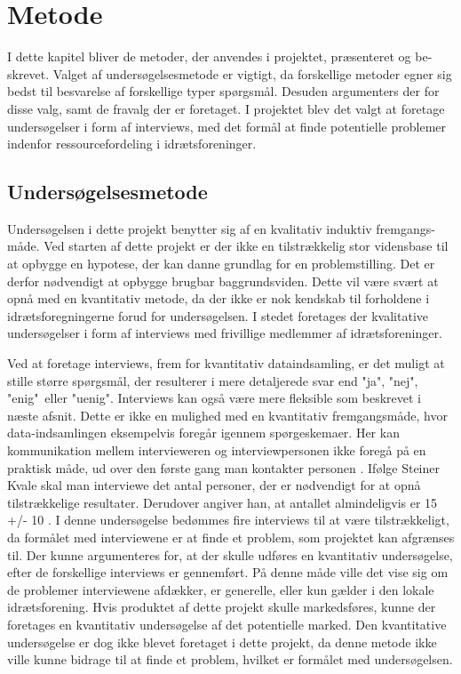 \chapter{Metode}\label{ch:metode}
I dette kapitel bliver de metoder, der anvendes i projektet, præsenteret og be-skrevet. Valget af undersøgelsesmetode er vigtigt, da forskellige metoder egner sig bedst til besvarelse af forskellige typer spørgsmål. Desuden argumenters der for disse valg, samt de fravalg der er foretaget. I projektet blev det valgt at foretage undersøgelser i form af interviews, med det formål at finde potentielle problemer indenfor ressourcefordeling i idrætsforeninger.

\section{Undersøgelsesmetode}
Undersøgelsen i dette projekt benytter sig af en kvalitativ induktiv fremgangs-måde. Ved starten af dette projekt er der ikke en tilstrækkelig stor vidensbase til at opbygge en hypotese, der kan danne grundlag for en problemstilling. Det er derfor nødvendigt at opbygge brugbar baggrundsviden. Dette vil være svært at opnå med en kvantitativ metode, da der ikke er nok kendskab til forholdene i idrætsforegningerne forud for undersøgelsen. I stedet foretages der kvalitative undersøgelser i form af interviews med frivillige medlemmer af idrætsforeninger.
\par
Ved at foretage interviews, frem for kvantitativ dataindsamling, er det muligt at stille større spørgsmål, der resulterer i mere detaljerede svar end "ja", "nej", "enig"\ eller "uenig". Interviews kan også være mere fleksible som beskrevet i næste afsnit. Dette er ikke en mulighed med en kvantitativ fremgangsmåde, hvor data-indsamlingen eksempelvis foregår igennem spørgeskemaer. Her kan kommunikation mellem intervieweren og interviewpersonen ikke foregå på en praktisk måde, ud over den første gang man kontakter personen \citep{kvale2015}.
\clearpage
Ifølge Steiner Kvale skal man interviewe det antal personer, der er nødvendigt for at opnå tilstrækkelige resultater. Derudover angiver han, at antallet almindeligvis er 15 +/- 10 \cite{kvale2015}. I denne undersøgelse bedømmes fire interviews til at være tilstrækkeligt, da formålet med interviewene er at finde et problem, som projektet kan afgrænses til. Der kunne argumenteres for, at der skulle udføres en kvantitativ undersøgelse, efter de forskellige interviews er gennemført. På denne måde ville det vise sig om de problemer interviewene afdækker, er generelle, eller kun gælder i den lokale idrætsforening. Hvis produktet af dette projekt skulle markedsføres, kunne der foretages en kvantitativ undersøgelse af det potentielle marked. Den kvantitative undersøgelse er dog ikke blevet foretaget i dette projekt, da denne metode ikke ville kunne bidrage til at finde et problem, hvilket er formålet med undersøgelsen.
